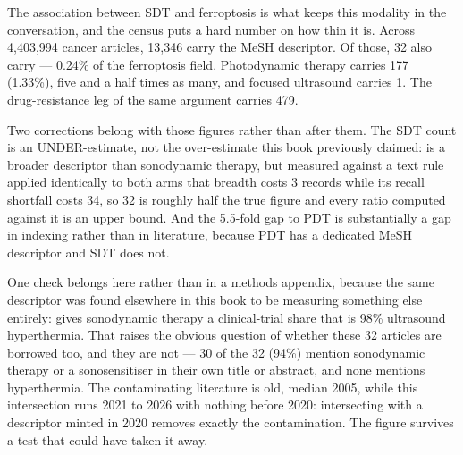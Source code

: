 \documentclass[11pt,twoside,openright]{report}
\begin{document}
The association between SDT and ferroptosis is what keeps this modality in the conversation, and the census puts a hard number on how thin it is. Across 4,403,994 cancer articles, 13,346 carry the MeSH  descriptor. Of those, 32 also carry  --- 0.24\% of the ferroptosis field. Photodynamic therapy carries 177 (1.33\%), five and a half times as many, and focused ultrasound carries 1. The drug-resistance leg of the same argument carries 479.

Two corrections belong with those figures rather than after them. The SDT count is an UNDER-estimate, not the over-estimate this book previously claimed:  is a broader descriptor than sonodynamic therapy, but measured against a text rule applied identically to both arms that breadth costs 3 records while its recall shortfall costs 34, so 32 is roughly half the true figure and every ratio computed against it is an upper bound. And the 5.5-fold gap to PDT is substantially a gap in indexing rather than in literature, because PDT has a dedicated MeSH descriptor and SDT does not.

One check belongs here rather than in a methods appendix, because the same descriptor was found elsewhere in this book to be measuring something else entirely:  gives sonodynamic therapy a clinical-trial share that is 98\% ultrasound hyperthermia. That raises the obvious question of whether these 32 articles are borrowed too, and they are not --- 30 of the 32 (94\%) mention sonodynamic therapy or a sonosensitiser in their own title or abstract, and none mentions hyperthermia. The contaminating literature is old, median 2005, while this intersection runs 2021 to 2026 with nothing before 2020: intersecting with a descriptor minted in 2020 removes exactly the contamination. The figure survives a test that could have taken it away.
\end{document}
